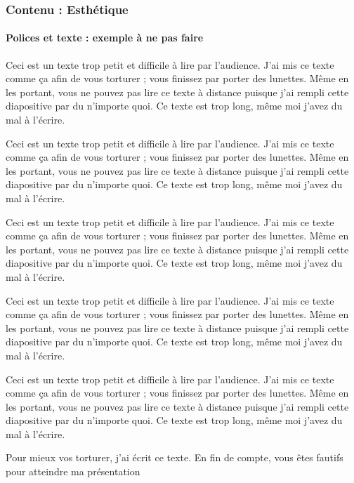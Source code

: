 \documentclass[xcolor=table, usenames,dvipsnames]{beamer}
\begin{document}
\begin{frame}
\frametitle{Contenu : Esthétique}
\framesubtitle{Polices et texte : exemple à ne pas faire}

{\tiny 

Ceci est un texte trop petit et difficile à lire par l'audience. 
J'ai mis ce texte comme ça afin de vous torturer ; vous finissez par porter des lunettes. 
Même en les portant, vous ne pouvez pas lire ce texte à distance puisque j'ai rempli cette diapositive par du n'importe quoi. 
Ce texte est trop long, même moi j'avez du mal à l'écrire.

Ceci est un texte trop petit et difficile à lire par l'audience. 
J'ai mis ce texte comme ça afin de vous torturer ; vous finissez par porter des lunettes. 
Même en les portant, vous ne pouvez pas lire ce texte à distance puisque j'ai rempli cette diapositive par du n'importe quoi. 
Ce texte est trop long, même moi j'avez du mal à l'écrire.

Ceci est un texte trop petit et difficile à lire par l'audience. 
J'ai mis ce texte comme ça afin de vous torturer ; vous finissez par porter des lunettes. 
Même en les portant, vous ne pouvez pas lire ce texte à distance puisque j'ai rempli cette diapositive par du n'importe quoi. 
Ce texte est trop long, même moi j'avez du mal à l'écrire.

Ceci est un texte trop petit et difficile à lire par l'audience. 
J'ai mis ce texte comme ça afin de vous torturer ; vous finissez par porter des lunettes. 
Même en les portant, vous ne pouvez pas lire ce texte à distance puisque j'ai rempli cette diapositive par du n'importe quoi. 
Ce texte est trop long, même moi j'avez du mal à l'écrire.

Ceci est un texte trop petit et difficile à lire par l'audience. 
J'ai mis ce texte comme ça afin de vous torturer ; vous finissez par porter des lunettes. 
Même en les portant, vous ne pouvez pas lire ce texte à distance puisque j'ai rempli cette diapositive par du n'importe quoi. 
Ce texte est trop long, même moi j'avez du mal à l'écrire.

}

{\calligra Pour mieux vos torturer, j'ai écrit ce texte. En fin de compte, vous êtes fautifs pour atteindre ma présentation}

\end{frame}
\end{document}
